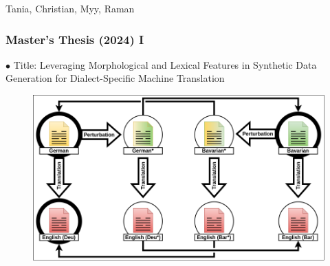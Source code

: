 \documentclass[aspectratio=169]{beamer}
\begin{document}
\begin{frame}[fragile]
\begin{minipage}{.4\textwidth}
\begin{figure}
            \end{figure}
            Tania, Christian, Myy, Raman
        \end{minipage}
\end{frame}


\begin{frame}[fragile]
	\frametitle{Master's Thesis (2024) I}
    {\color{thiscolor}$\bullet$} Title: Leveraging Morphological and Lexical Features in Synthetic Data Generation for Dialect-Specific Machine Translation
    \begin{minipage}{.6\textwidth}
      \begin{figure}
        \centering
        \includegraphics[width=1.0\textwidth]{images/ChameleonMT-MT-ExperimentSetupOverview.png} 
    \end{figure}
    \end{minipage}%
    \begin{minipage}{.4\textwidth}
    \vspace{-4mm}
        \centering
        \begin{figure}
        \centering
        \captionsetup[subfigure]{labelformat=empty}
            \\

\end{figure}
\end{minipage}
\end{frame}
\end{document}
